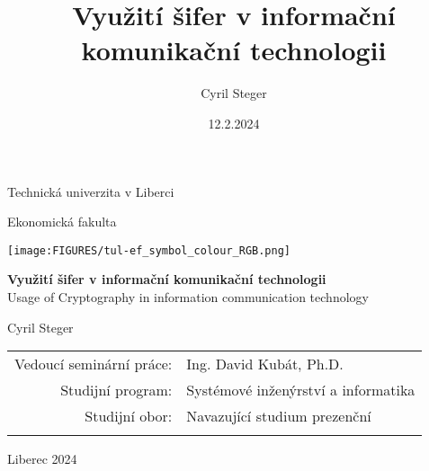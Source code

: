 \title{Využití šifer v informační komunikační technologii}
\author{Cyril Steger}
\date{12.2.2024}
\pagestyle{empty}
\begin{center}
    
    {\large Technická univerzita v Liberci}

    \medskip
    {\large Ekonomická fakulta}
    \vfill
    \centerline{\mbox{\texttt{[image: \\FIGURES/tul-ef\_symbol\_colour\_RGB.png]}}} %
    \vfill
    \vspace{5mm}
    {\LARGE\bfseries Využití šifer v informační komunikační technologii \\}
    \vspace{5mm}
    {\large Usage of Cryptography in information communication technology \\}

    \vfill
    \vspace{5mm}
    {\large Cyril Steger}
    
    \vfill
    \begin{tabular}{rl}
        Vedoucí seminární práce: &  Ing. David Kubát, Ph.D.\\   %
        \noalign{\vspace{2mm}}
        Studijní program: & Systémové inženýrství a informatika\\
        \noalign{\vspace{2mm}}
        Studijní obor: & Navazující studium prezenční\\
        \noalign{\vspace{2mm}}
    \end{tabular}
    \medskip

    \vfill
    {\large Liberec 2024}
    
\end{center}